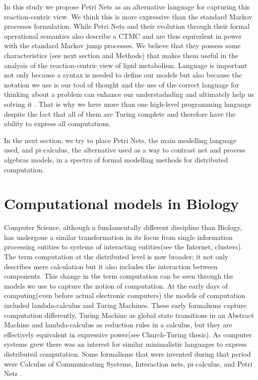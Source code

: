 In this study we propose Petri Nets as an alternative language for capturing this
reaction-centric view. We think this is more expressive than the
standard Markov processes formulation. While Petri Nets and their
evolution through their formal operational semantics also describe a
CTMC and are thus equivalent in power with the standard Markov jump
processes. We believe that they possess some characteristics (see next
section and Methods) that makes them useful in the analysis of the
reaction-centric view of lipid metabolism. Language is important not
only because a syntax is needed to define our models but also because
the notation we use is our tool of thought and the use of the correct
language for thinking about a problem can enhance our understadnding
and ultimately help us solving it \cite [] {iverson2007notation}. That is why we have more
than one high-level programming language despite the fact that all of
them are Turing complete and therefore have the ability to express all
computations.

In the next section, we try to place Petri Nets, the main modelling
language used, and pi-calculus, the alternative used as a way to
contrast net and process algebras models, in a spectra of formal
modelling methods for distributed computation.

\section{Computational models in Biology}
Computer Science, although a fundamentally different discipline than
Biology, has undergone a similar transformation in its focus from
single information processing entities to systems of interacting
entities(see the Internet, clusters). The term computation at the
distributed level is now broader; it not only describes mere
calculation but it also includes the interaction between
components. This change in the term computation can be seen through
the models we use to capture the notion of computation. At the early
days of computing(even before actual electronic computers) the models
of computation included lambda-calculus and Turing Machines. These
early formalisms capture computation differently, Turing Machine as
global state transitions in an Abstract Machine and lambda-calculus
as reduction rules in a calculus, but they are effectively equivalent
in expressive power(see Church-Turing thesis). As computer systems
grew there was an interest for similar
minimalistic languages to express distributed computation. Some
formalisms that were invented during that period were
\citet{milner1980calculus} Calculus of Communicating Systems,
\citet{lafont1989interaction} Interaction nets,
\citet{milner1992calculus} pi-calculus, and Petri
Nets \cite [] {murata1989petri}.

